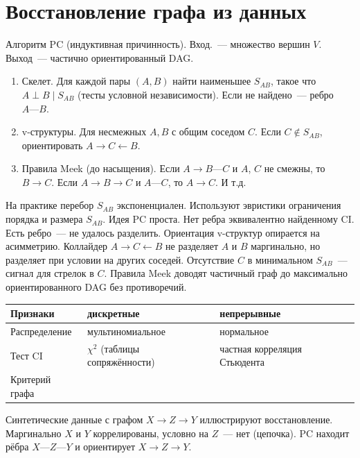 \section{Восстановление графа из данных}

Алгоритм PC (индуктивная причинность). Вход.~--- множество вершин $V$. Выход~--- частично ориентированный DAG.
\begin{enumerate}
    \item Скелет. Для каждой пары $(A,B)$ найти наименьшее
          $S_{AB}$, такое что $A\perp B\mid S_{AB}$ (тесты условной независимости). Если не найдено~--- ребро $A\text{---}B$.
    \item v-структуры. Для несмежных $A,B$ с общим соседом
          $C$. Если $C\notin S_{AB}$, ориентировать $A\to C\leftarrow B$.
    \item Правила Meek (до насыщения). Если $A\to B\text{---}C$
          и $A$, $C$ не смежны, то $B\to C$. Если $A\to B\to C$ и $A\text{---}C$, то $A\to C$. И т.д.
\end{enumerate}
На практике перебор $S_{AB}$ экспоненциален. Используют эвристики ограничения порядка и размера $S_{AB}$.
Идея PC проста. Нет ребра эквивалентно найденному CI. Есть ребро~--- не удалось разделить.
Ориентация v-структур опирается на асимметрию. Коллайдер $A\to C\leftarrow B$ не разделяет $A$ и $B$ маргинально, но разделяет при условии на других соседей. Отсутствие $C$ в минимальном $S_{AB}$~--- сигнал для стрелок в $C$.
Правила Meek доводят частичный граф до максимально ориентированного DAG без противоречий.

\begin{center}
\footnotesize
\begin{tabularx}{\linewidth}{|>{\raggedright\arraybackslash}X|>{\raggedright\arraybackslash}X|>{\raggedright\arraybackslash}X|}\hline
Признаки & дискретные & непрерывные \\\hline
Распределение & мультиномиальное & нормальное \\\hline
Тест CI & $\chi^2$ (таблицы сопряжённости) & частная корреляция Стьюдента \\\hline
Критерий графа & \multicolumn{2}{c|}{BIC} \\\hline
\end{tabularx}
\end{center}

Синтетические данные с графом $X\to Z\to Y$ иллюстрируют восстановление. Маргинально $X$ и $Y$ коррелированы, условно на $Z$~--- нет (цепочка).
PC находит рёбра $X\text{---}Z\text{---}Y$ и ориентирует $X\to Z\to Y$.

